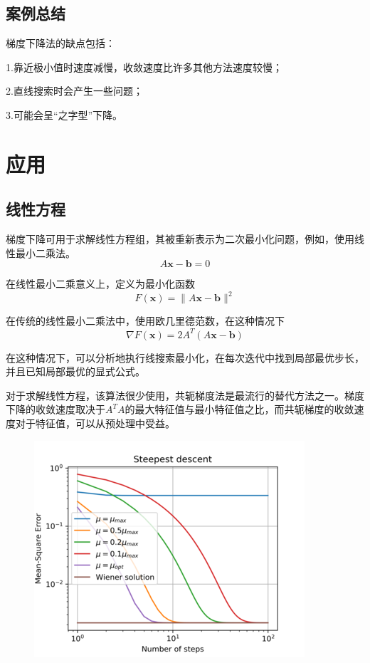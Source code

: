 \documentclass[12pt,a4paper]{article}
\begin{document}
\subsection{案例总结}
梯度下降法的缺点包括：

1.靠近极小值时速度减慢，收敛速度比许多其他方法速度较慢；

2.直线搜索时会产生一些问题；

3.可能会呈“之字型”下降。

\section{应用}
\subsection{线性方程}
梯度下降可用于求解线性方程组，其被重新表示为二次最小化问题，例如，使用线性最小二乘法。
\begin{equation}
	A\mathbf x-\mathbf b=0
\end{equation}

在线性最小二乘意义上，定义为最小化函数
\begin{equation}
	F(\mathbf x)=\|A\mathbf x-\mathbf b\|^2
\end{equation}

在传统的线性最小二乘法中，使用欧几里德范数，在这种情况下
\begin{equation}
	\nabla F(\mathbf x)=2A^T(A\mathbf x-\mathbf b)
\end{equation}

在这种情况下，可以分析地执行线搜索最小化，在每次迭代中找到局部最优步长，并且已知局部最优的显式公式。

对于求解线性方程，该算法很少使用，共轭梯度法是最流行的替代方法之一。梯度下降的收敛速度取决于$A^TA$的最大特征值与最小特征值之比，而共轭梯度的收敛速度对于特征值，可以从预处理中受益。
\begin{figure}[H]
	\centering
	\includegraphics[scale=3]{./figures/figure-3.png}
\end{figure}
\end{document}
